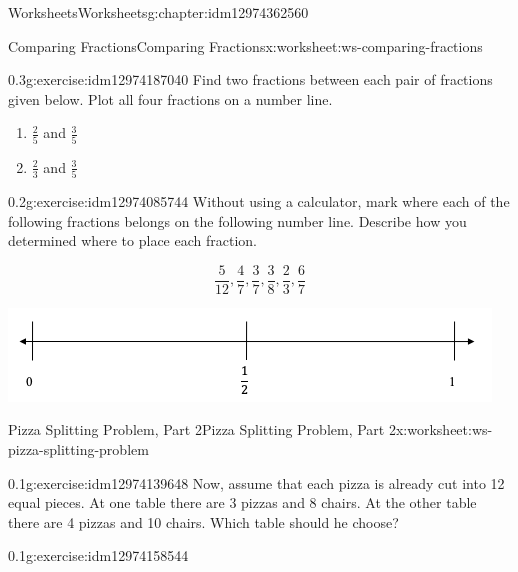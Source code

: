 \documentclass[twoside,11pt,]{book}
\begin{document}
\begin{chapterptx}{Worksheets}{}{Worksheets}{}{}{g:chapter:idm12974362560}
\begin{worksheet-section-numberless}{Comparing Fractions}{}{Comparing Fractions}{}{}{x:worksheet:ws-comparing-fractions}
\begin{divisionexercise}{4}{}{0.3}{g:exercise:idm12974187040}
Find two fractions between each pair of fractions given below. Plot all four fractions on a number line.%
%
\begin{enumerate}[label=(\alph*)]
\item{}\(\frac{2}{5} \) and \(\frac{3}{5} \)%
\item{}\(\frac{2}{3} \) and \(\frac{3}{5} \)%
\end{enumerate}
\end{divisionexercise}%
\begin{divisionexercise}{5}{}{0.2}{g:exercise:idm12974085744}%
Without using a calculator, mark where each of the following fractions belongs on the following number line. Describe how you determined where to place each fraction.%
\par
%
\begin{equation*}
\frac{5}{12} , \frac{4}{7} , \frac{3}{7} , \frac{3}{8} , \frac{2}{3} , \frac{6}{7} 
\end{equation*}
%
\begin{sidebyside}{1}{0.05}{0.05}{0}%
\begin{sbspanel}{0.9}%
\includegraphics[width=1\linewidth]{images/number-line-half-one.png}
\end{sbspanel}%
\end{sidebyside}%
\end{divisionexercise}%
\end{worksheet-section-numberless}
\restoregeometry
%
%
\typeout{************************************************}
\typeout{************************************************}
%
\begin{worksheet-section-numberless}{Pizza Splitting Problem, Part 2}{}{Pizza Splitting Problem, Part 2}{}{}{x:worksheet:ws-pizza-splitting-problem}
\begin{divisionexercise}{1}{}{0.1}{g:exercise:idm12974139648}%
Now, assume that each pizza is already cut into 12 equal pieces. At one table there are 3 pizzas and 8 chairs.  At the other table there are 4 pizzas and 10 chairs.  Which table should he choose?%
\end{divisionexercise}%
\begin{divisionexercise}{2}{}{0.1}{g:exercise:idm12974158544}%

\end{divisionexercise}
\end{worksheet-section-numberless}
\end{chapterptx}
\end{document}
